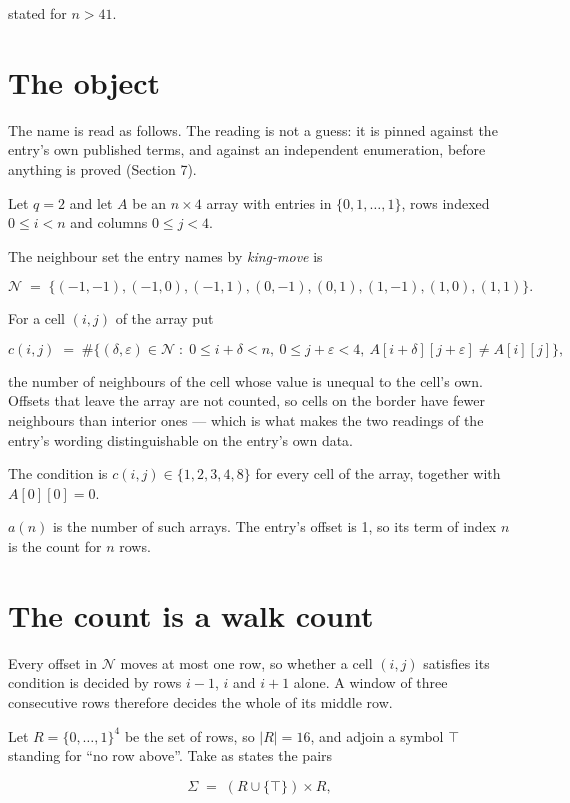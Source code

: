 \documentclass[11pt]{article}
\theoremstyle{definition}
\begin{document}
stated for $n > 41$.

\section{The object}

The name is read as follows. The reading is not a guess: it is pinned against the entry's own published terms, and against an independent enumeration, before anything is proved (Section 7).

Let $q = 2$ and let $A$ be an $n \times 4$ array with entries in $\{0,1,\dots,1\}$, rows indexed $0 \le i < n$ and columns $0 \le j < 4$.

The neighbour set the entry names by {\itshape king-move} is

\[\mathcal{N} \;=\; \{(-1,-1), (-1,0), (-1,1), (0,-1), (0,1), (1,-1), (1,0), (1,1)\}.\]

For a cell $(i,j)$ of the array put

\[c(i,j) \;=\; \#\bigl\{(\delta,\varepsilon)\in\mathcal{N} \;:\; 0\le i+\delta<n,\ 0\le j+\varepsilon<4,\ A[i+\delta][j+\varepsilon] \neq A[i][j]\bigr\},\]

the number of neighbours of the cell whose value is unequal to the cell's own. Offsets that leave the array are not counted, so cells on the border have fewer neighbours than interior ones --- which is what makes the two readings of the entry's wording distinguishable on the entry's own data.

The condition is $c(i,j) \in \{1, 2, 3, 4, 8\}$ for every cell of the array, together with $A[0][0]=0$.

$a(n)$ is the number of such arrays. The entry's offset is 1, so its term of index $n$ is the count for $n$ rows.

\section{The count is a walk count}

Every offset in $\mathcal{N}$ moves at most one row, so whether a cell $(i,j)$ satisfies its condition is decided by rows $i-1$, $i$ and $i+1$ alone. A window of three consecutive rows therefore decides the whole of its middle row.

Let $R = \{0,\dots,1\}^{4}$ be the set of rows, so $|R| = 16$, and adjoin a symbol $\top$ standing for ``no row above''. Take as states the pairs

\[\Sigma \;=\; (R \cup \{\top\}) \times R,\]
\end{document}
